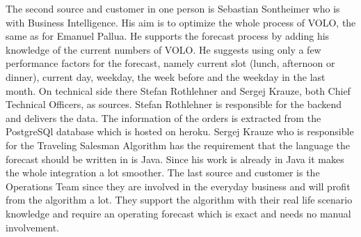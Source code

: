 The second source and customer in one person is Sebastian Sontheimer who is with Business Intelligence. His aim is to optimize the whole process of VOLO, the same as for Emanuel Pallua. He supports the forecast process by adding his knowledge of the current numbers of VOLO. He suggests using only a few performance factors for the forecast, namely current slot (lunch, afternoon or dinner), current day, weekday, the week before and the weekday in the last month.\newline
On technical side there Stefan Rothlehner and Sergej Krauze, both Chief Technical Officers, as sources. Stefan Rothlehner is responsible for the backend and delivers the data. The information of the orders is extracted from the PostgreSQl database which is hosted on heroku. Sergej Krauze who is responsible for the Traveling Salesman Algorithm has the requirement that the language the forecast should be written in is Java. Since his work is already in Java it makes the whole integration a lot smoother.\newline
The last source and customer is the Operations Team since they are involved in the everyday business and will profit from the algorithm a lot. They support the algorithm with their real life scenario knowledge and require an operating forecast which is exact and needs no manual involvement.
